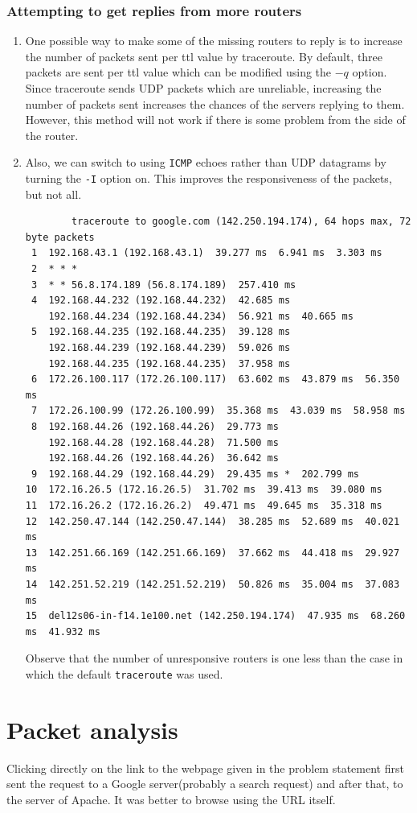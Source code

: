 \documentclass[a4paper]{article}
\begin{document}
\subsubsection{Attempting to get replies from more routers}
\begin{enumerate}
        \item One possible way to make some of the missing routers to reply is to increase the number of packets sent per ttl value by traceroute. By default, three packets are sent per ttl value which can be modified using the $-q$ option. Since traceroute sends UDP packets which are unreliable, increasing the number of packets sent increases the chances of the servers replying to them. However, this method will not work if there is some problem from the side of the router.
        \item Also, we can switch to using \texttt{ICMP} echoes rather than UDP datagrams by turning the \texttt{-I} option on. This improves the responsiveness of the packets, but not all.
        \begin{lstlisting}
        traceroute to google.com (142.250.194.174), 64 hops max, 72 byte packets
 1  192.168.43.1 (192.168.43.1)  39.277 ms  6.941 ms  3.303 ms
 2  * * *
 3  * * 56.8.174.189 (56.8.174.189)  257.410 ms
 4  192.168.44.232 (192.168.44.232)  42.685 ms
    192.168.44.234 (192.168.44.234)  56.921 ms  40.665 ms
 5  192.168.44.235 (192.168.44.235)  39.128 ms
    192.168.44.239 (192.168.44.239)  59.026 ms
    192.168.44.235 (192.168.44.235)  37.958 ms
 6  172.26.100.117 (172.26.100.117)  63.602 ms  43.879 ms  56.350 ms
 7  172.26.100.99 (172.26.100.99)  35.368 ms  43.039 ms  58.958 ms
 8  192.168.44.26 (192.168.44.26)  29.773 ms
    192.168.44.28 (192.168.44.28)  71.500 ms
    192.168.44.26 (192.168.44.26)  36.642 ms
 9  192.168.44.29 (192.168.44.29)  29.435 ms *  202.799 ms
10  172.16.26.5 (172.16.26.5)  31.702 ms  39.413 ms  39.080 ms
11  172.16.26.2 (172.16.26.2)  49.471 ms  49.645 ms  35.318 ms
12  142.250.47.144 (142.250.47.144)  38.285 ms  52.689 ms  40.021 ms
13  142.251.66.169 (142.251.66.169)  37.662 ms  44.418 ms  29.927 ms
14  142.251.52.219 (142.251.52.219)  50.826 ms  35.004 ms  37.083 ms
15  del12s06-in-f14.1e100.net (142.250.194.174)  47.935 ms  68.260 ms  41.932 ms
        \end{lstlisting}
        Observe that the number of unresponsive routers is one less than the case in which the default \texttt{traceroute} was used.
\end{enumerate}


\section{Packet analysis}
Clicking directly on the link to the webpage given in the problem statement first sent the request to a Google server(probably a search request) and after that, to the server of Apache. It was better to browse using the URL itself. 
\end{document}
